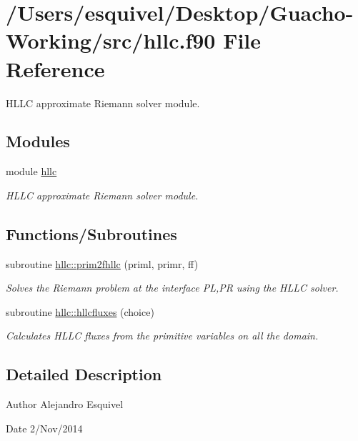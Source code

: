 \hypertarget{hllc_8f90}{}\section{/\+Users/esquivel/\+Desktop/\+Guacho-\/\+Working/src/hllc.f90 File Reference}
\label{hllc_8f90}


H\+L\+L\+C approximate Riemann solver module.  


\subsection*{Modules}
\begin{DoxyCompactItemize}
\item 
module \hyperlink{namespacehllc}{hllc}
\begin{DoxyCompactList}\small\item\em H\+L\+L\+C approximate Riemann solver module. \end{DoxyCompactList}\end{DoxyCompactItemize}
\subsection*{Functions/\+Subroutines}
\begin{DoxyCompactItemize}
\item 
subroutine \hyperlink{namespacehllc_a25f1f218ed55fbda8b6311baa3ff6f80}{hllc\+::prim2fhllc} (priml, primr, ff)
\begin{DoxyCompactList}\small\item\em Solves the Riemann problem at the interface P\+L,P\+R using the H\+L\+L\+C solver. \end{DoxyCompactList}\item 
subroutine \hyperlink{namespacehllc_a702fd4ba2d419a6ac6d21a9bc25ba230}{hllc\+::hllcfluxes} (choice)
\begin{DoxyCompactList}\small\item\em Calculates H\+L\+L\+C fluxes from the primitive variables on all the domain. \end{DoxyCompactList}\end{DoxyCompactItemize}


\subsection{Detailed Description}
\begin{DoxyAuthor}{Author}
Alejandro Esquivel 
\end{DoxyAuthor}
\begin{DoxyDate}{Date}
2/\+Nov/2014 
\end{DoxyDate}
